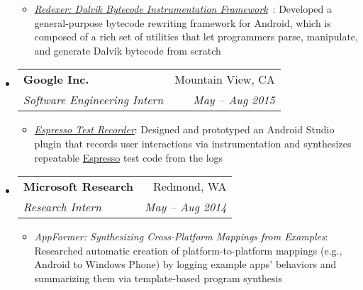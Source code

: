 \documentclass[letterpaper,11pt]{article}
\makeatletter
\newcommand{\ressubheading}[4]{
\begin{tabular*}{6.5in}{l@{\extracolsep{\fill}}r}
    \textbf{#1} & #2 \\
    \textit{#3} & \textit{#4} \\
\end{tabular*}\vspace{-6pt}}
\makeatother
\begin{document}
\begin{itemize}
{\begin{itemize}
\item\emph{\href{https://github.com/plum-umd/redexer}{Redexer: Dalvik Bytecode Instrumentation Framework}}~\cite{spsm12}: %
Developed a general-purpose bytecode rewriting framework for Android,
which is composed of a rich set of utilities that let programmers
parse, manipulate, and generate Dalvik bytecode from scratch
        \end{itemize}
        }
    \item
      \ressubheading{{Google Inc.}}{Mountain View, CA}{Software Engineering Intern}{May -- Aug 2015}
        {
\small
        \begin{itemize}
\item\emph{\href{https://developer.android.com/studio/test/espresso-test-recorder.html}{Espresso Test Recorder}}:
Designed and prototyped an Android Studio plugin that records user interactions
via instrumentation and synthesizes repeatable
\href{https://developer.android.com/training/testing/ui-testing/espresso-testing.html}{Espresso}
test code from the logs
        \end{itemize}
        }
    \item
      \ressubheading{{Microsoft Research}}{Redmond, WA}{Research Intern}{May -- Aug 2014}
        {
\small
        \begin{itemize}
\item\emph{AppFormer: Synthesizing Cross-Platform Mappings from Examples}:
Researched automatic creation of platform-to-platform mappings
(e.g., Android to Windows Phone) by logging example apps' behaviors and
summarizing them via template-based program synthesis
        \end{itemize}
        }
%

\end{itemize}
\end{document}

